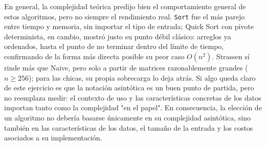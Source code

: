 En general, la complejidad teórica predijo bien el comportamiento
general de estos algoritmos, pero no siempre el rendimiento real.
\texttt{Sort} fue el más parejo entre tiempo y memoria, sin
importar el tipo de entrada; Quick Sort con pivote determinista, en
cambio, mostró justo su punto débil clásico: arreglos ya
ordenados, hasta el punto de no terminar dentro del límite de tiempo,
confirmando de la forma más directa posible su peor caso $O(n^2)$.
Strassen sí rinde más que Naive, pero solo a partir de matrices
razonablemente grandes ($n\geq 256$); para las chicas, su propia
sobrecarga lo deja atrás. Si algo queda claro de este ejercicio es que
la notación asintótica es un buen punto de partida, pero no reemplaza
medir: el contexto de uso y las características concretas de los datos
importan tanto como la complejidad "en el papel".
En consecuencia, la elección de un algoritmo no debería basarse únicamente
en su complejidad asintótica, sino también en las características de los datos, 
el tamaño de la entrada y los costos asociados a su implementación.